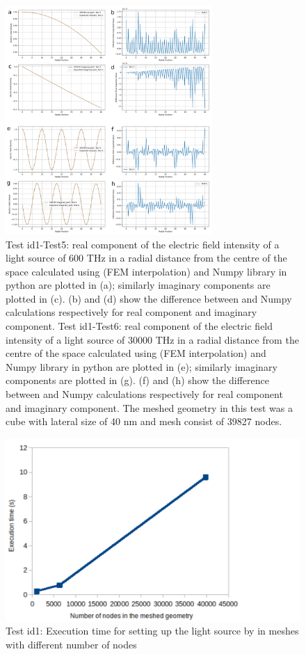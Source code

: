 \documentclass[12pt, titlepage]{article}
\begin{document}
\begin{enumerate}
    \begin{figure} \centering \includegraphics[width=0.7\textwidth]{R3-test1-test5-6.png}
    	\caption{Test id1-Test5: real component of the electric field intensity of a light source of 600 THz in a radial distance from the centre of the space calculated using \progname{} (FEM interpolation) and Numpy library in python are plotted in (a); similarly imaginary components are plotted in (c). (b) and (d) show the difference between \progname{} and Numpy calculations respectively for real component and imaginary component. Test id1-Test6: real component of the electric field intensity of a light source of 30000 THz in a radial distance from the centre of the space calculated using \progname{} (FEM interpolation) and Numpy library in python are plotted in (e); similarly imaginary components are plotted in (g). (f) and (h) show the difference between \progname{} and Numpy calculations respectively for real component and imaginary component. The meshed geometry in this test was a cube with lateral size of 40 nm and mesh consist of 39827 nodes.} \label{test1test-5-6} 
    \end{figure}

    \begin{figure} \centering \includegraphics[width=1\textwidth]{R3-test1-nodes-time.png}
    	\caption{Test id1: Execution time for setting up the light source by \progname in meshes with different number of nodes} \label{test1nodes} 
    \end{figure}


\end{enumerate}
\end{document}
